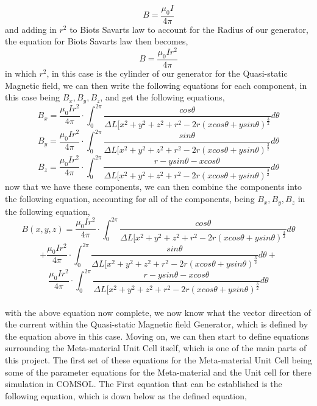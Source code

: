 \documentclass[]{article}
\begin{document}
\begin{equation}
B = \frac{\mu_0I}{4\pi}
\end{equation}
and adding in $r^2$ to Biots Savarts law to account for the Radius of our generator, the equation for Biots Savarts law then becomes,
\begin{equation}
B = \frac{\mu_0Ir^2}{4\pi}
\end{equation}
in which $r^2$, in this case is the cylinder of our generator for the Quasi-static Magnetic field, we can then write the following equations for each component, in this case being $B_x,B_y,B_z$, and get the following equations,
\\
\begin{equation}
B_x = \frac{\mu_0Ir^2}{4\pi} \cdot \int_{0}^{2\pi} \frac{cos\theta}{\Delta{L}[x^2+y^2+z^2+r^2-2r(xcos\theta+ysin\theta)^\frac{3}{2}}d\theta
\end{equation}
\begin{equation}
B_y = \frac{\mu_0Ir^2}{4\pi} \cdot \int_{0}^{2\pi} \frac{sin\theta}{\Delta{L}[x^2+y^2+z^2+r^2-2r(xcos\theta+ysin\theta)^\frac{3}{2}}d\theta
\end{equation}
\begin{equation}
B_z = \frac{\mu_0Ir^2}{4\pi} \cdot \int_{0}^{2\pi} \frac{r-ysin\theta-xcos\theta}{\Delta{L}[x^2+y^2+z^2+r^2-2r(xcos\theta+ysin\theta)^\frac{3}{2}}d\theta
\end{equation}
now that we have these components, we can then combine the components into the following equation, accounting for all of the components, being $B_x, B_y, B_z$ in the following equation,
\\
\[B(x,y,z) = \frac{\mu_0Ir^2}{4\pi} \cdot \int_{0}^{2\pi} \frac{cos\theta}{\Delta{L}[x^2+y^2+z^2+r^2-2r(xcos\theta+ysin\theta)^\frac{3}{2}}d\theta\]
\[+ \frac{\mu_0Ir^2}{4\pi} \cdot \int_{0}^{2\pi} \frac{sin\theta}{\Delta{L}[x^2+y^2+z^2+r^2-2r(xcos\theta+ysin\theta)^\frac{3}{2}}d\theta +\]
\[\frac{\mu_0Ir^2}{4\pi} \cdot \int_{0}^{2\pi} \frac{r-ysin\theta-xcos\theta}{\Delta{L}[x^2+y^2+z^2+r^2-2r(xcos\theta+ysin\theta)^\frac{3}{2}}d\theta\]
\\
with the above equation now complete, we now know what the vector direction of the current within the Quasi-static Magnetic field Generator, which is defined by the equation above in this case. Moving on, we can then start to define equations surrounding the Meta-material Unit Cell itself, which is one of the main parts of this project. The first set of these equations for the Meta-material Unit Cell being some of the parameter equations for the Meta-material and the Unit cell for there simulation in COMSOL. The First equation that can be established is the following equation, which is down below as the defined equation,
\end{document}
